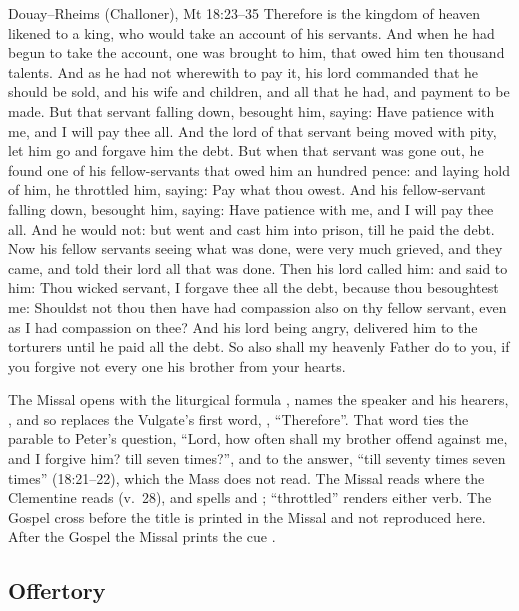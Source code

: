 \begin{englishwitness}{Douay--Rheims (Challoner), Mt 18:23--35}
Therefore is the kingdom of heaven likened to a king, who would take an account
of his servants. And when he had begun to take the account, one was brought to
him, that owed him ten thousand talents. And as he had not wherewith to pay it,
his lord commanded that he should be sold, and his wife and children, and all
that he had, and payment to be made. But that servant falling down, besought
him, saying: Have patience with me, and I will pay thee all. And the lord of
that servant being moved with pity, let him go and forgave him the debt. But
when that servant was gone out, he found one of his fellow-servants that owed
him an hundred pence: and laying hold of him, he throttled him, saying: Pay what
thou owest. And his fellow-servant falling down, besought him, saying: Have
patience with me, and I will pay thee all. And he would not: but went and cast
him into prison, till he paid the debt. Now his fellow servants seeing what was
done, were very much grieved, and they came, and told their lord all that was
done. Then his lord called him: and said to him: Thou wicked servant, I forgave
thee all the debt, because thou besoughtest me: Shouldst not thou then have had
compassion also on thy fellow servant, even as I had compassion on thee? And his
lord being angry, delivered him to the torturers until he paid all the debt. So
also shall my heavenly Father do to you, if you forgive not every one his
brother from your hearts.
\end{englishwitness}

\noindent The Missal opens with the liturgical formula ,
names the speaker and his hearers, , and so replaces the Vulgate's first word, , ``Therefore''.
That word ties the parable to Peter's question, ``Lord, how often shall my
brother offend against me, and I forgive him? till seven times?'', and to the
answer, ``till seventy times seven times'' (18:21--22), which the Mass does not
read. The Missal reads  where the Clementine reads
 (v.~28), and spells  and ;
``throttled'' renders either verb. The Gospel cross before the title is printed
in the Missal and not reproduced here. After the Gospel the Missal prints the cue
.

\subsection{Offertory}
\label{proper-offertory}

